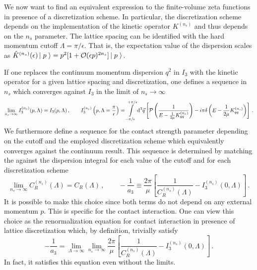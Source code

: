 We now want to find an equivalent expression to the finite-volume zeta functions in presence of a discretization scheme.
In particular, the discretization scheme depends on the implementation of the kinetic operator $K^{(n_s)}$ and thus depends on the $n_s$ parameter.
The lattice spacing can be identified with the hard momentum cutoff $\Lambda = \pi / \epsilon$.
That is, the expectation value of the dispersion scales as $\hat K^{(n_s)}(\epsilon) \left|\;p\;\right\rangle = p^2 [1 + \mathcal O(\epsilon p)^{2 n_s}]\left|\;p\;\right\rangle$.

If one replaces the continuum momentum dispersion $q^2$ in $I_3$ with the kinetic operator for a given lattice spacing and discretization, one defines a sequence in $n_s$ which converges against $I_3$ in the limit of $n_s \to \infty$
\begin{equation}
	\lim\limits_{n_s \to \infty} I^{(n_s)}_3(p, \Lambda) = I_3(p, \Lambda)
	\, , \qquad
	I^{(n_s)}_3\left(p, \Lambda=\frac{\pi}{\epsilon} \right)
	=
	    \int\limits_{-\pi/\epsilon}^{+\pi/\epsilon}
        \mathrm{d}^3 \vec{q}
        \left[
            \mathcal{P} \left(
                \frac{1}{
                    E - \frac{1}{2\mu} K_{qq}^{(n_s)} }
                \right)
            -i \pi \delta\left(E - \frac{1}{2\mu}K_{qq}^{(n_s)}\right)
        \right]
        \, .
\end{equation}
We furthermore define a sequence for the contact strength parameter depending on the cutoff and the employed discretization scheme which equivalently converges against the continuum result.
This sequence is determined by matching the against the dispersion integral for each value of the cutoff and for each discretization scheme
\begin{equation}\label{eq:dispersion-renormalization}
	\lim\limits_{n_s \to \infty} C^{(n_s)}_R(\Lambda) = C_R(\Lambda) \, ,
	\qquad
	- \frac{1}{a_3}
	\equiv
	\frac{2 \pi}{\mu}
		\left[
		\frac{1}{C_R^{(n_s)}(\Lambda)} - I_3^{(n_s)}(0, \Lambda)
		\right]
	\, .
\end{equation}
It is possible to make this choice since both terms do not depend on any external momentum $p$.
This is specific for the contact interaction.
One can view this choice as the renormalization equation for contact interaction in presence of lattice discretization which, by definition, trivially satisfy
\begin{equation}
	- \frac{1}{a_3}
	=
	\lim\limits_{\Lambda \to \infty} \lim\limits_{n_s \to \infty}
	\frac{2 \pi}{\mu}
		\left[
		\frac{1}{C_R^{(n_s)}(\Lambda)} - I_3^{(n_s)}(0, \Lambda)
		\right]
	\, .
\end{equation}
In fact, it satisfies this equation even without the limits.

